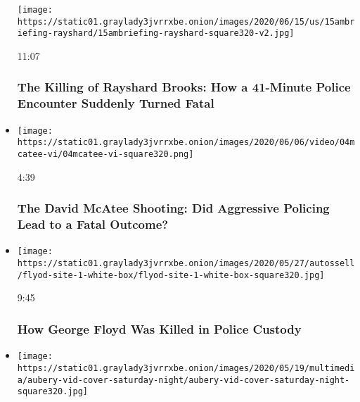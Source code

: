 \begin{itemize}
  \texttt{[image: https://static01.graylady3jvrrxbe.onion/images/2020/06/15/us/15ambriefing-rayshard/15ambriefing-rayshard-square320-v2.jpg]}

  11:07

  \hypertarget{the-killing-of-rayshard-brooks-how-a-41-minute-police-encounter-suddenly-turned-fatal}{%
  \subsubsection{The Killing of Rayshard Brooks: How a 41-Minute Police
  Encounter Suddenly Turned
  Fatal}\label{the-killing-of-rayshard-brooks-how-a-41-minute-police-encounter-suddenly-turned-fatal}}
\item
  \href{https://www.nytimes3xbfgragh.onion/video/us/100000007175316/the-david-mcatee-shooting-did-aggressive-policing-lead-to-a-fatal-outcome.html?action=click\&module=video-series-bar\&region=header\&pgtype=Article\&playlistId=video/investigations}{}

  \texttt{[image: https://static01.graylady3jvrrxbe.onion/images/2020/06/06/video/04mcatee-vi/04mcatee-vi-square320.png]}

  4:39

  \hypertarget{the-david-mcatee-shooting-did-aggressive-policing-lead-to-a-fatal-outcome}{%
  \subsubsection{The David McAtee Shooting: Did Aggressive Policing Lead
  to a Fatal
  Outcome?}\label{the-david-mcatee-shooting-did-aggressive-policing-lead-to-a-fatal-outcome}}
\item
  \href{https://www.nytimes3xbfgragh.onion/video/us/100000007159353/george-floyd-arrest-death-video.html?action=click\&module=video-series-bar\&region=header\&pgtype=Article\&playlistId=video/investigations}{}

  \texttt{[image: https://static01.graylady3jvrrxbe.onion/images/2020/05/27/autossell/flyod-site-1-white-box/flyod-site-1-white-box-square320.jpg]}

  9:45

  \hypertarget{how-george-floyd-was-killed-in-police-custody}{%
  \subsubsection{How George Floyd Was Killed in Police
  Custody}\label{how-george-floyd-was-killed-in-police-custody}}
\item
  \texttt{[image: https://static01.graylady3jvrrxbe.onion/images/2020/05/19/multimedia/aubery-vid-cover-saturday-night/aubery-vid-cover-saturday-night-square320.jpg]}


\end{itemize}
